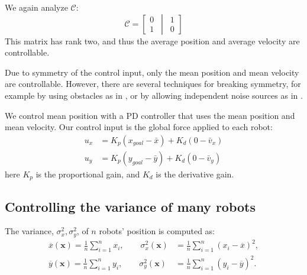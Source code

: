We again analyze $\mathcal{C}$:
\begin{equation}
\mathcal{C}=\left[ \begin{matrix} 
0\\
1
\end{matrix}
\,\middle\vert\,
 \begin{matrix} 
1\\
0
\end{matrix}
 \right]
\end{equation}
This matrix has rank two, and thus the average position and average velocity are controllable.


Due to symmetry of the control input, only the mean position and mean velocity are controllable. However, there are several techniques for breaking symmetry, for example by using obstacles as in \cite{Becker2013b}, or by allowing independent noise sources as in \cite{beckerIJRR2014}.

We control mean position with a PD controller that uses the mean position and mean velocity. Our control input is the global force applied to each robot:
\begin{align}
u_x &= K_{p}(x_{goal} - \bar{x}) + K_{d}(0-\bar{v}_x) \nonumber\\
u_y &= K_{p}(y_{goal}  - \bar{y}) + K_{d}(0-\bar{v}_y)  \label{eq:PDcontrolPosition}
\end{align}
here $K_{p}$ is the proportional gain, and $K_{d}$ is the derivative gain. 


\subsection{Controlling the variance of many robots}\label{sec:VarianceControl}

The variance, $\sigma_x^2,\sigma_y^2$, of $n$ robots' position is computed as:
\begin{align}\label{eq:meanVar}
 \overline{x}(\mathbf{x}) = \frac{1}{n} \sum_{i=1}^n x_{i}, \qquad  %
\sigma_x^2(\mathbf{x}) &= \frac{1}{n} \sum_{i=1}^n (x_{i} - \overline{x})^2,  \nonumber \\ 
 \overline{y}(\mathbf{x}) = \frac{1}{n} \sum_{i=1}^n y_{i}, \qquad  %
\sigma_y^2(\mathbf{x}) &= \frac{1}{n} \sum_{i=1}^n (y_{i} - \overline{y})^2.  
\end{align}

